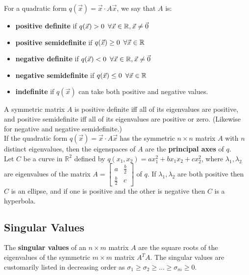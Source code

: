 \documentclass[]{scrartcl}
\begin{document}
	For a quadratic form $q(\vec{x}) = \vec{x} \cdot A\vec{x}$, we say that $A$ is:
	\begin{itemize}
		\item \textbf{positive definite} if $q(\vec{x}) > 0 \enskip \forall \vec{x} \in \mathbb{R}, \vec{x} \neq \vec{0}$
		\item \textbf{positive semidefinite} if $q(\vec{x}) \geq 0 \enskip \forall \vec{x} \in \mathbb{R}$
		\item \textbf{negative definite} if $q(\vec{x}) < 0 \enskip \forall \vec{x} \in \mathbb{R}, \vec{x} \neq \vec{0}$
		\item \textbf{negative semidefinite} if $q(\vec{x}) \leq 0 \enskip \forall \vec{x} \in \mathbb{R}$
		\item \textbf{indefinite} if $q(\vec{x})$ can take both positive and negative values.
	\end{itemize}

	A symmetric matrix $A$ is positive definite iff all of its eigenvalues are positive, and positive semidefinite iff all of its eigenvalues are positive or zero. (Likewise for negative and negative semidefinite.) \\
	
	If the quadratic form $q(\vec{x}) = \vec{x} \cdot A\vec{x}$ has the symmetric $n \times n$ matrix $A$ with $n$ distinct eigenvalues, then the eigenspaces of $A$ are the \textbf{principal axes} of $q$.\\
	
	Let $C$ be a curve in $\mathbb{R}^2$ defined by $q(x_1, x_2) = ax^2_1 + bx_1x_2 + cx^2_2$, where $\lambda_1, \lambda_2$ are eigenvalues of the matrix $A = 
	\begin{bmatrix} a & \frac{b}{2}\\ \frac{b}{2} & c \end{bmatrix}$ of $q$. 
	If $\lambda_1, \lambda_2$ are both positive then $C$ is an ellipse, and if one is positive and the other is negative then $C$ is a hyperbola.\\
	
	\subsection{Singular Values}
	The \textbf{singular values} of an $n \times m$ matrix $A$ are the square roots of the eigenvalues of the symmetric $m \times m$ matrix $A^TA$. The singular values are customarily listed in decreasing order as $\sigma_1 \geq \sigma_2 \geq \ldots \geq \sigma_m \geq 0$.\\
	
\end{document}
